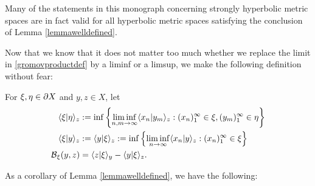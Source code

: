 \begin{remark}
Many of the statements in this monograph concerning strongly hyperbolic metric spaces are in fact valid for all hyperbolic metric spaces satisfying the conclusion of Lemma \ref{lemmawelldefined}.
\end{remark}

Now that we know that it does not matter too much whether we replace the limit in \eqref{gromovproductdef} by a liminf or a limsup, we make the following definition without fear:

\begin{definition}
For $\xi,\eta\in\partial X$ and $y,z\in X$, let
\begin{align} \label{gromovboundarydef1}
\langle \xi|\eta\rangle_z &:= \inf\left\{\liminf_{n,m\to\infty}\langle x_n|y_m\rangle_z:(x_n)_1^\infty\in\xi,(y_m)_1^\infty\in\eta\right\}\\ \label{gromovboundarydef2}
\langle \xi|y\rangle_z &:= \langle y|\xi\rangle_z := \inf\left\{\liminf_{n\to\infty}\langle x_n|y\rangle_z:(x_n)_1^\infty\in\xi\right\}\\ \label{gromovboundarydef3}
\operatorname{\mathcal B}_\xi(y,z) &= \langle z|\xi\rangle_y - \langle y|\xi\rangle_z.
\end{align}
\end{definition}

As a corollary of Lemma \ref{lemmawelldefined}, we have the following:


